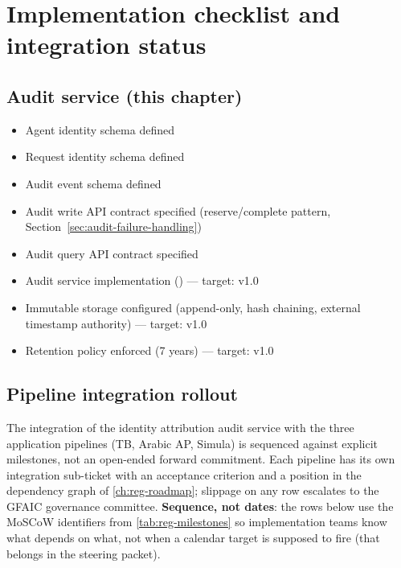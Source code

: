 \section{Implementation checklist and integration status}

\subsection{Audit service (this chapter)}

\begin{itemize}
  \item[\texttt{[x]}] Agent identity schema defined
  \item[\texttt{[x]}] Request identity schema defined
  \item[\texttt{[x]}] Audit event schema defined
  \item[\texttt{[x]}] Audit write API contract specified
        (reserve/complete pattern, Section~\ref{sec:audit-failure-handling})
  \item[\texttt{[x]}] Audit query API contract specified
  \item[\texttt{[ ]}] Audit service implementation
        () --- target: v1.0
  \item[\texttt{[ ]}] Immutable storage configured (append-only,
        hash chaining, external timestamp authority) --- target: v1.0
  \item[\texttt{[ ]}] Retention policy enforced (7 years) --- target: v1.0
\end{itemize}

\subsection{Pipeline integration rollout}
\label{sec:identity-integration-rollout}

The integration of the identity attribution audit service with the
three application pipelines (TB, Arabic AP, Simula) is sequenced
against explicit milestones, not an open-ended forward commitment.
Each pipeline has its own integration sub-ticket with an acceptance
criterion and a position in the dependency graph of
\cref{ch:reg-roadmap}; slippage on any row escalates to the GFAIC
governance committee. \textbf{Sequence, not dates}: the rows below
use the MoSCoW identifiers from \cref{tab:reg-milestones} so
implementation teams know what depends on what, not when a
calendar target is supposed to fire (that belongs in the steering
packet).

